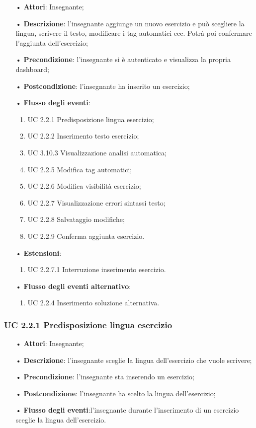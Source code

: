 \begin{itemize}
	\item[•] \textbf{Attori}: Insegnante;
	\item[•] \textbf{Descrizione}: l'insegnante aggiunge un nuovo esercizio e può scegliere la lingua, scrivere il testo,
modificare i tag automatici ecc. Potrà poi confermare l'aggiunta dell'esercizio;
	\item[•] \textbf{Precondizione}: l'insegnante si è autenticato e visualizza la propria dashboard;
	\item[•] \textbf{Postcondizione}: l'insegnante ha inserito un esercizio;
	\item[•] \textbf{Flusso degli eventi}:
	\begin{enumerate}
		\item UC 2.2.1 Predisposizione lingua esercizio;
		\item UC 2.2.2 Inserimento testo esercizio;
		\item UC 3.10.3  Visualizzazione analisi automatica;
		\item UC 2.2.5 Modifica tag automatici;
		\item UC 2.2.6 Modifica visibilità esercizio;
		\item UC 2.2.7 Visualizzazione errori sintassi testo;
		\item UC 2.2.8 Salvataggio modifiche;
		\item UC 2.2.9 Conferma aggiunta esercizio.
	\end{enumerate}
	\item[•] \textbf{Estensioni}:	
	\begin{enumerate}
		\item UC 2.2.7.1 Interruzione inserimento esercizio.
	\end{enumerate}
	\item[•] \textbf{Flusso degli eventi alternativo}:
	\begin{enumerate}
		\item UC 2.2.4 Inserimento soluzione alternativa.
	\end{enumerate}
\end{itemize}

\subsubsection{UC 2.2.1 Predisposizione lingua esercizio}
\begin{itemize}
	\item[•] \textbf{Attori}: Insegnante;
	\item[•] \textbf{Descrizione}: l'insegnante sceglie la lingua dell’esercizio che vuole scrivere;
	\item[•] \textbf{Precondizione}: l'insegnante sta inserendo un esercizio;
	\item[•] \textbf{Postcondizione}: l'insegnante ha scelto la lingua dell'esercizio;
	\item[•] \textbf{Flusso degli eventi}:l'insegnante durante l'inserimento di un esercizio sceglie la lingua dell'esercizio.
\end{itemize}

